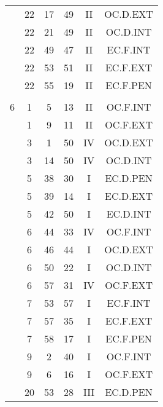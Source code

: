 \documentclass[12pt, a4paper]{article}
\begin{document}
\begin{multicols}{3}
{\begin{tabular}{c c c c c c}
	 	 	 	 & 22 & 17 & 49 & II & OC.D.EXT\\%
	 	 	 	 & 22 & 21 & 49 & II & OC.D.INT\\%
	 	 	 	 & 22 & 49 & 47 & II & EC.F.INT\\%
	 	 	 	 & 22 & 53 & 51 & II & EC.F.EXT\\%
	 	 	 	 & 22 & 55 & 19 & II & EC.F.PEN\\%
	 	 	 	 & & & & & \\%
	 	 	 	6 & 1 & 5 & 13 & II & OC.F.INT\\%
	 	 	 	 & 1 & 9 & 11 & II & OC.F.EXT\\%
	 	 	 	 & 3 & 1 & 50 & IV & OC.D.EXT\\%
	 	 	 	 & 3 & 14 & 50 & IV & OC.D.INT\\%
	 	 	 	 & 5 & 38 & 30 & I & EC.D.PEN\\%
	 	 	 	 & 5 & 39 & 14 & I & EC.D.EXT\\%
	 	 	 	 & 5 & 42 & 50 & I & EC.D.INT\\%
	 	 	 	 & 6 & 44 & 33 & IV & OC.F.INT\\%
	 	 	 	 & 6 & 46 & 44 & I & OC.D.EXT\\%
	 	 	 	 & 6 & 50 & 22 & I & OC.D.INT\\%
	 	 	 	 & 6 & 57 & 31 & IV & OC.F.EXT\\%
	 	 	 	 & 7 & 53 & 57 & I & EC.F.INT\\%
	 	 	 	 & 7 & 57 & 35 & I & EC.F.EXT\\%
	 	 	 	 & 7 & 58 & 17 & I & EC.F.PEN\\%
	 	 	 	 & 9 & 2 & 40 & I & OC.F.INT\\%
	 	 	 	 & 9 & 6 & 16 & I & OC.F.EXT\\%
	 	 	 	 & 20 & 53 & 28 & III & EC.D.PEN\\%

\end{tabular}}
\end{multicols}
\end{document}
